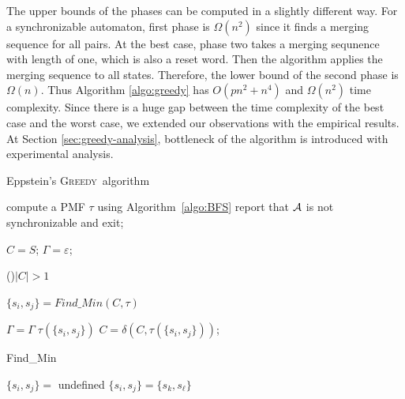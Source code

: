 \documentclass[12pt]{article}
\newcommand{\greedyAlgo}{\textsc{Greedy}}
\begin{document}
The upper bounds of the phases can be computed in a slightly different way. For a synchronizable automaton, first phase is $\Omega(n^2)$ since it finds a merging sequence for all pairs. At the best case, phase two takes a merging sequnence with length of one, which is also a reset word. Then the algorithm applies the merging sequence to all states. Therefore, the lower bound of the second phase is $\Omega(n)$. Thus Algorithm \ref{algo:greedy} has $O(pn^2 + n^4)$ and $\Omega(n^2)$ time complexity. Since there is a huge gap between the time complexity of the best case and the worst case, we extended our observations with the empirical results. At Section \ref{sec:greedy-analysis}, bottleneck of the algorithm is introduced with experimental analysis.

\begin{algorithm}[ht]
	\caption{Eppstein's \greedyAlgo\ algorithm}
	\label{algo:greedy}
	
	
	compute a PMF $\tau$ using Algorithm~\ref{algo:BFS}\;
	{
		report that ${\cal A}$ is not synchronizable and exit;	
	}

	
	$C = S$; 
	$\Gamma = \varepsilon$; 
	
	\While(){$|C| > 1$}
	{
		$\{ s_i,s_j \} = Find\_Min(C, \tau)$\;
		
		
		$\Gamma = \Gamma \; \tau(\{ s_i,s_j \})$\;
		$C = \delta(C,\tau(\{ s_i,s_j \}))$;
	}
\end{algorithm}


\begin{algorithm}[ht]
	\caption{Find\_Min}
	\label{algo:find-min}
	
	
	$\{ s_i,s_j \} =$ undefined\;
	{
		{
			$\{ s_i,s_j \} = \{ s_k, s_\ell \}$
		}
	}
\end{algorithm}
\end{document}
